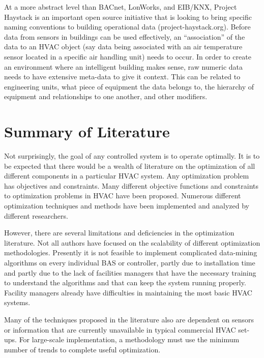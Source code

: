 At a more abstract level than BACnet, LonWorks, and EIB/KNX, Project Haystack is an important open source initiative that is looking to bring specific naming conventions to building operational data (project-haystack.org). Before data from sensors in buildings can be used effectively, an ``association''  of the data to an HVAC object (say data being associated with an air temperature sensor located in a specific air handling unit) needs to occur. In order to create an environment where an intelligent building makes sense, raw numeric data needs to have extensive meta-data to give it context. This can be related to engineering units, what piece of equipment the data belongs to, the hierarchy of equipment and relationships to one another, and other modifiers. 




\section{Summary of Literature}

Not surprisingly, the goal of any controlled system is to operate optimally. It is to be  expected that there would be a wealth of literature on the optimization of all different components in a particular HVAC system. Any optimization problem has objectives and constraints. Many different objective functions and constraints to optimization problems in HVAC have been proposed. Numerous different optimization techniques and methods have been implemented and analyzed by different researchers. 

However, there are several limitations and deficiencies in the optimization literature. Not all authors have focused on the scalability of different optimization methodologies. Presently it is not feasible to implement complicated data-mining algorithms on every individual BAS or controller, partly due to installation time and partly due to the lack of facilities managers that have the necessary training to understand the algorithms and that can keep the system running properly. Facility managers already have difficulties in maintaining the most basic HVAC systems. 

Many of the techniques proposed in the literature also are dependent on sensors or information that are currently unavailable in typical commercial HVAC set-ups. For large-scale implementation, a methodology must use the minimum number of trends to complete useful optimization.

